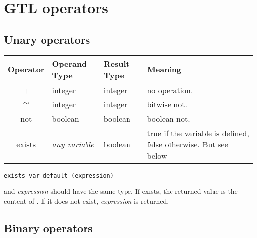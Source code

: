 \section{GTL operators}

\subsection{Unary operators}

\begin{longtable}{c|l|l|p{2.56in}}
{\bf Operator}&{\bf Operand Type}&{\bf Result Type}&{\bf Meaning}\\
\hline\endhead
 {+}&
  {integer}&
  {integer}&
  {no operation.}\\
 {$\sim$}&
  {integer}&
  {integer}&
  {bitwise not.}\\
 {not}&
  {boolean}&
  {boolean}&
  {boolean not.}\\
 {exists}&
  {{\em any variable}}&
  {boolean}&
  {true if the variable is defined, false otherwise. But see below}\\
\end{longtable}

 
\begin{lstlisting}[language=goilTemplate]
exists var default (expression)
\end{lstlisting}

 and {\em expression} should have the same type. If  exists, the returned value is the content of . If it does not exist, {\em expression} is returned.


\subsection{Binary operators}

